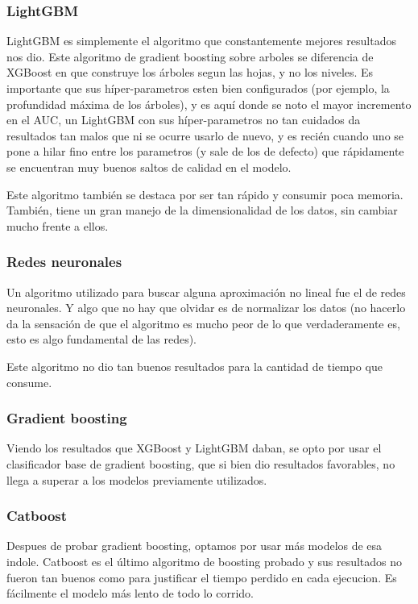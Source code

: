\documentclass[a4paper]{article}
\begin{document}
\subsubsection{LightGBM}

LightGBM es simplemente el algoritmo que constantemente mejores resultados nos dio. Este algoritmo de gradient boosting sobre arboles se diferencia de XGBoost en que construye los árboles segun las hojas, y no los niveles. Es importante que sus híper-parametros esten bien configurados (por ejemplo, la profundidad máxima de los árboles), y es aquí donde se noto el mayor incremento en el AUC, un LightGBM con sus híper-parametros no tan cuidados da resultados tan malos que ni se ocurre usarlo de nuevo, y es recién cuando uno se pone a hilar fino entre los parametros (y sale de los de defecto) que rápidamente se encuentran muy buenos saltos de calidad en el modelo.

Este algoritmo también se destaca por ser tan rápido y consumir poca memoria. También, tiene un gran manejo de la dimensionalidad de los datos, sin cambiar mucho frente a ellos.

\subsubsection{Redes neuronales}

Un algoritmo utilizado para buscar alguna aproximación no lineal fue el de redes neuronales. Y algo que no hay que olvidar es de normalizar los datos (no hacerlo da la sensación de que el algoritmo es mucho peor de lo que verdaderamente es, esto es algo fundamental de las redes). 

Este algoritmo no dio tan buenos resultados para la cantidad de tiempo que consume.

\subsubsection{Gradient boosting}

Viendo los resultados que XGBoost y LightGBM daban, se opto por usar el clasificador base de gradient boosting, que si bien dio resultados favorables, no llega a superar a los modelos previamente utilizados.

\subsubsection{Catboost}

Despues de probar gradient boosting, optamos por usar más modelos de esa indole. Catboost es el último algoritmo de boosting probado y sus resultados no fueron tan buenos como para justificar el tiempo perdido en cada ejecucion. Es fácilmente el modelo más lento de todo lo corrido.
\end{document}
